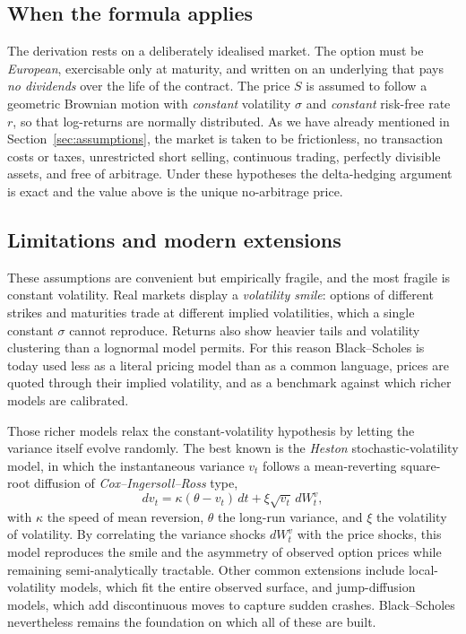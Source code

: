 \documentclass[a4paper,12pt]{article}
\numberwithin{equation}{section}
\begin{document}
\subsection*{When the formula applies}
The derivation rests on a deliberately idealised market. The option must be
\emph{European}, exercisable only at maturity, and written on an underlying that
pays \emph{no dividends} over the life of the contract. The price $S$ is assumed to
follow a geometric Brownian motion with \emph{constant} volatility $\sigma$ and
\emph{constant} risk-free rate $r$, so that log-returns are normally distributed.
As we have already mentioned in Section~\ref{sec:assumptions}, the market is taken to be frictionless, no transaction costs or taxes, unrestricted
short selling, continuous trading, perfectly divisible assets, and free of
arbitrage. Under these hypotheses the delta-hedging argument is exact and the value
above is the unique no-arbitrage price.

\subsection*{Limitations and modern extensions}
These assumptions are convenient but empirically fragile, and the most fragile is
constant volatility. Real markets display a \emph{volatility smile}: options of
different strikes and maturities trade at different implied volatilities, which a
single constant $\sigma$ cannot reproduce. Returns also show heavier tails and
volatility clustering than a lognormal model permits. For this reason
Black--Scholes is today used less as a literal pricing model than as a common
language, prices are quoted through their implied volatility, and as a benchmark
against which richer models are calibrated.

Those richer models relax the constant-volatility hypothesis by letting the
variance itself evolve randomly. The best known is the \emph{Heston}
stochastic-volatility model, in which the instantaneous variance $v_t$ follows a
mean-reverting square-root diffusion of \emph{Cox--Ingersoll--Ross} type,
\begin{equation}\label{eq:heston-var}
  dv_t = \kappa(\theta - v_t)\,dt + \xi\sqrt{v_t}\,dW_t^{v},
\end{equation}
with $\kappa$ the speed of mean reversion, $\theta$ the long-run variance, and
$\xi$ the volatility of volatility. By correlating the variance shocks $dW_t^{v}$
with the price shocks, this model reproduces the smile and the asymmetry of
observed option prices while remaining semi-analytically tractable. Other common
extensions include local-volatility models, which fit the entire observed surface,
and jump-diffusion models, which add discontinuous moves to capture sudden crashes.
Black--Scholes nevertheless remains the foundation on which all of these are built.
\end{document}
